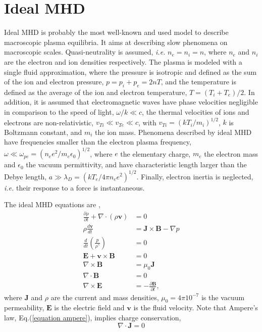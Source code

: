 \documentclass[my_thesis.tex]{subfiles}
\begin{document}
\section{Ideal MHD}
\label{section ideal mhd}
Ideal \ac{MHD} is probably the most well-known and used model to describe macroscopic plasma equilibria. It aims at describing slow phenomena on macroscopic scales. Quasi-neutrality is assumed, \textit{i.e.} $n_e=n_i=n$, where $n_e$ and $n_i$ are the electron and ion densities respectively. The plasma is modeled with a single fluid approximation, where the pressure is isotropic and defined as the sum of the ion and electron pressure, $p=p_i+p_e=2nT$, and the temperature is defined as the average of the ion and electron temperature, $T=(T_i+T_e)/2$. In addition, it is assumed that electromagnetic waves have phase velocities negligible in comparison to the speed of light, $\omega/k\ll c$, the thermal velocities of ions and electrons are non-relativistic, $v_{Ti}\ll v_{Te}\ll c$, with $v_{Ti}=(kT_i/m_i)^{1/2}$, $k$ is Boltzmann constant, and $m_i$ the ion mass. Phenomena described by ideal MHD have frequencies smaller than the electron plasma frequency, $\omega\ll \omega_{pe}=(n_ee^2/m_e\epsilon_0)^{1/2}$, where $e$ the elementary charge, $m_e$ the electron mass and $\epsilon_0$ the vacuum permittivity, and have characteristic length larger than the Debye length, $a\gg \lambda_D=(kT_e/4\pi n_e e^2)^{1/2}$. Finally, electron inertia is neglected, \textit{i.e.} their response to a force is instantaneous.

The ideal \ac{MHD} equations are \citep{Freidberg2014},
\begin{align}
	\frac{\partial \rho}{\partial t} + \nabla\cdot(\rho\mathbf{v}) &= 0 \label{mass equation}\\
	\rho\frac{d\mathbf{v}}{dt} &= \mathbf{J}\times\mathbf{B} - \nabla p \label{momentum equation}\\
	\frac{d}{dt}\left(\frac{p}{\rho^\gamma}\right) &= 0 \label{energy equation}\\
	\mathbf{E} + \mathbf{v}\times\mathbf{B} &= 0 \label{ideal Ohms law}\\
	\nabla\times\mathbf{B} &=\mu_0\mathbf{J} \label{equation ampere}\\
	\nabla\cdot\mathbf{B}&=0 \label{equation div B}\\
	\nabla\times\mathbf{E}&=-\frac{\partial \mathbf{B}}{\partial t}, \label{equation rot E}
\end{align}
where $\mathbf{J}$ and $\rho$ are the current and mass densities, $\mu_0=4\pi 10^{-7}$ is the vacuum permeability, $\mathbf{E}$ is the electric field and $\mathbf{v}$ is the fluid velocity. Note that Ampere's law, Eq.(\ref{equation ampere}), implies charge conservation,
\begin{equation}
	\nabla\cdot\mathbf{J} = 0\label{equation charge conservation}
\end{equation}
\end{document}
